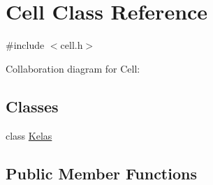 \hypertarget{classCell}{}\section{Cell Class Reference}
\label{classCell}


{\ttfamily \#include $<$cell.\+h$>$}



Collaboration diagram for Cell\+:
\subsection*{Classes}
\begin{DoxyCompactItemize}
\item 
class \hyperlink{classCell_1_1Kelas}{Kelas}
\end{DoxyCompactItemize}
\subsection*{Public Member Functions}
